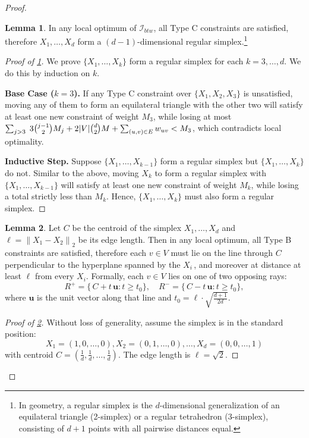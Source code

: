\documentclass{article}
\theoremstyle{definition}  %
\newtheorem{lemma}{Lemma}
\theoremstyle{plain}
\numberwithin{observation}{section}
\numberwithin{claim}{section}
\numberwithin{fact}{section}
\numberwithin{lemma}{section}
\numberwithin{proposition}{section}
\numberwithin{theorem}{section}
\numberwithin{corollary}{section}
\numberwithin{definition}{section}
\newcommand{\calI}{\ensuremath{\mathcal{I}}}
\newcommand{\norm}[1]{\left\| #1 \right\|}
\theoremstyle{plain}
\begin{document}
\begin{proof}
\begin{lemma}\label{lem:btw-typec}
In any local optimum of $\calI_{btw}$, all Type C constraints are satisfied, therefore $X_1, \dots, X_d$ form a $(d-1)$-dimensional regular simplex.\footnote{In geometry, a regular simplex is the $d$-dimensional generalization of an equilateral triangle (2-simplex) or a regular tetrahedron (3-simplex), consisting of $d+1$ points with all pairwise distances equal.}
\end{lemma}

\begin{proof}[Proof of \cref{lem:btw-typec}]
We prove $\{X_1,\dots,X_k\}$ form a regular simplex for each $k=3,\dots,d$. We do this by induction on $k$.

\textbf{Base Case ($k=3$).}  If any Type C constraint over $\{X_1,X_2,X_3\}$ is unsatisfied, moving any of them to form an equilateral triangle with the other two will satisfy at least one new constraint of weight $M_3$, while losing at most
$\sum_{j>3} \; 3 \tbinom{j-1}{2} M_j + 2 |V| \tbinom{d}{2} M + \sum_{(u,v) \in E} w_{uv} < M_3$, which contradicts local optimality.

\textbf{Inductive Step.} Suppose $\{X_1,\dots,X_{k-1}\}$ form a regular simplex but $\{X_1,\dots,X_k\}$ do not. Similar to the above, moving $X_k$ to form a regular simplex with $\{X_1,\dots,X_{k-1}\}$ will satisfy at least one new constraint of weight $M_k$, while losing a total strictly less than $M_k$. Hence, $\{X_1,\dots,X_k\}$ must also form a regular simplex.
\end{proof}

\begin{lemma}\label{lem:btw-typeb}
Let $C$ be the centroid of the simplex $X_1,\dots,X_d$ and $\ell = \norm{X_1 - X_2}_2$ be its edge length. Then in any local optimum, 
all Type B constraints are satisfied, therefore each $v \in V$ must lie on the line through $C$ perpendicular to the hyperplane spanned by the $X_i$\,, and moreover at distance at least $\ell$ from every $X_i$. Formally, each $v \in V$ lies on one of two opposing rays:
\[
R^+ = \bigl\{\, C + t \, \mathbf{u} : t \ge t_0 \bigr\}, \quad
R^- = \bigl\{\, C - t \, \mathbf{u} : t \ge t_0 \bigr\},
\]
where $\mathbf{u}$ is the unit vector along that line and $t_0 = \ell \cdot \sqrt{\frac{d+1}{2d}}$.
\end{lemma}

\begin{proof}[Proof of \cref{lem:btw-typeb}]
Without loss of generality, assume the simplex is in the standard position:
\[
X_1 = (1, 0, \ldots, 0), X_2 = (0, 1, \ldots, 0), \ldots, X_d = (0, 0, \ldots, 1)
\]
with centroid $C = \left(\frac{1}{d}, \frac{1}{d}, \ldots, \frac{1}{d}\right)$. The edge length is $\ell = \sqrt{2}$.


\end{proof}
\end{proof}
\end{document}
